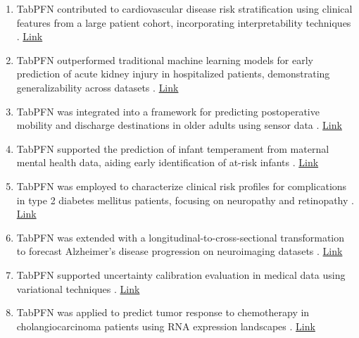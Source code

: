 \begin{enumerate}
\item TabPFN contributed to cardiovascular disease risk stratification using clinical features from a large patient cohort, incorporating interpretability techniques \cite{hc_usecase13_ml_health_tabpfn}. \href{https://github.com/Bruno-LSo/ML-Health-TABPFN}{Link}

\item TabPFN outperformed traditional machine learning models for early prediction of acute kidney injury in hospitalized patients, demonstrating generalizability across datasets \cite{hc_usecase14_aki_ssrn_tabpfn}. \href{https://papers.ssrn.com/sol3/papers.cfm?abstract_id=5397006}{Link}

\item TabPFN was integrated into a framework for predicting postoperative mobility and discharge destinations in older adults using sensor data \cite{hc_usecase15_postop_mobility_sensors}. \href{https://www.mdpi.com/1424-8220/25/16/5021}{Link}

\item TabPFN supported the prediction of infant temperament from maternal mental health data, aiding early identification of at-risk infants \cite{hc_usecase16_infant_temperament_tabpfn}. \href{https://www.frontiersin.org/journals/public-health/articles/10.3389/fpubh.2025.1659987/abstract}{Link}

\item TabPFN was employed to characterize clinical risk profiles for complications in type 2 diabetes mellitus patients, focusing on neuropathy and retinopathy \cite{hc_usecase17_t2dm_complications_tabpfn}. \href{https://www.frontiersin.org/journals/endocrinology/articles/10.3389/fendo.2025.1657366/abstract}{Link}

\item TabPFN was extended with a longitudinal-to-cross-sectional transformation to forecast Alzheimer's disease progression on neuroimaging datasets \cite{hc_usecase18_ad_l2c_tabpfn}. \href{https://arxiv.org/abs/2508.17649}{Link}

\item TabPFN supported uncertainty calibration evaluation in medical data using variational techniques \cite{hc_usecase19_uncertainty_vbll_tabpfn}. \href{https://arxiv.org/abs/2509.10048}{Link}

\item TabPFN was applied to predict tumor response to chemotherapy in cholangiocarcinoma patients using RNA expression landscapes \cite{hc_usecase20_cholangio_aacr_tabpfn}. \href{https://aacrjournals.org/clincancerres/article/31/13_Supplement/A020/763312}{Link}


\end{enumerate}
